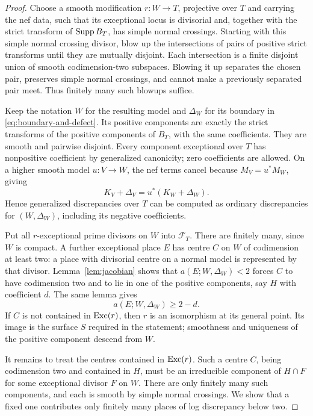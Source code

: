 \begin{proof}
Choose a smooth modification $r\colon W\to T$, projective over $T$ and
carrying the nef data, such that its exceptional locus is divisorial and, together with
the strict transform of $\operatorname{Supp} B_T$, has simple normal crossings.
Starting with this simple normal crossing divisor, blow up the
intersections of pairs of positive strict transforms until they are
mutually disjoint.  Each intersection is a finite disjoint union of smooth
codimension-two subspaces.  Blowing it up separates the chosen pair,
preserves simple normal crossings, and cannot make a previously separated
pair meet.  Thus finitely many such blowups suffice.

Keep the notation $W$ for the resulting model and $\Delta_W$ for its
boundary in \eqref{eq:boundary-and-defect}.  Its positive components are
exactly the strict transforms of the positive components of $B_T$, with
the same coefficients.  They are smooth and pairwise disjoint.  Every
component exceptional over $T$ has nonpositive coefficient by
generalized canonicity; zero coefficients are allowed.  On a higher
smooth model $u\colon V\to W$,
the nef terms cancel because $M_V=u^*M_W$, giving
\[
 K_V+\Delta_V=u^*(K_W+\Delta_W).
\]
Hence generalized discrepancies over $T$ can be computed as ordinary
discrepancies for $(W,\Delta_W)$, including its negative coefficients.

Put all $r$-exceptional prime divisors on $W$ into $\mathcal F_T$.
There are finitely many, since $W$ is compact.  A further exceptional
place $E$ has centre $C$ on $W$ of codimension at least two: a place with
divisorial centre on a normal model is represented by that divisor.
Lemma~\ref{lem:jacobian} shows that
$a(E;W,\Delta_W)<2$ forces $C$ to have codimension two and to lie in
one of the positive components, say $H$ with coefficient $d$.  The same
lemma gives
\begin{equation}
 a(E;W,\Delta_W)\geq2-d.
 \label{eq:resolution-low-bound}
\end{equation}
If $C$ is not contained in $\operatorname{Exc}(r)$, then $r$ is an isomorphism at its
general point.  Its image is the surface $S$ required in the statement;
smoothness and uniqueness of the positive component descend from $W$.

It remains to treat the centres contained in $\operatorname{Exc}(r)$.  Such a centre
$C$, being codimension two and contained in $H$, must be an irreducible
component of $H\cap F$ for some exceptional divisor $F$ on $W$.
There are only finitely many such components, and each is smooth by
simple normal crossings.  We show that a fixed one contributes only
finitely many places of log discrepancy below two.


\end{proof}
